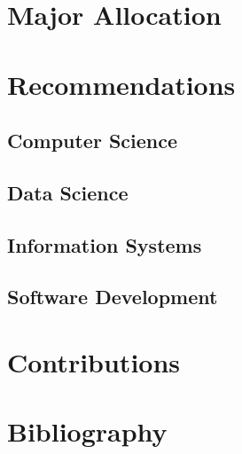 \documentclass[12pt,a4paper]{article}
\begin{document}
\section{Major Allocation}
\lipsum[1]
\newpage

\section{Recommendations}
\subsection{Computer Science}
\lipsum[1]
\newpage

\subsection{Data Science}
\lipsum[1]
\newpage

\subsection{Information Systems}
\lipsum[1]
\newpage

\subsection{Software Development}
\lipsum[1]
\newpage

\section{Contributions}\label{sec:lit-rev}
\lipsum[3-4]\cite{einstein}
\newpage

\section{Bibliography}\label{sec:res}
\lipsum[7-8]\cite{knuthwebsite}
\newpage



\end{document}
